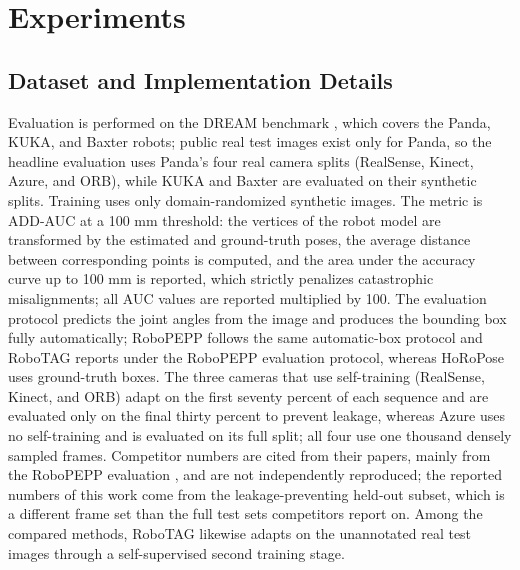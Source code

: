 \section{Experiments}
\label{sec:experiments}

\subsection{Dataset and Implementation Details}
\label{sec:setup}

Evaluation is performed on the DREAM benchmark \cite{lee2020camera}, which covers the Panda, KUKA, and Baxter robots; public real test images exist only for Panda, so the headline evaluation uses Panda's four real camera splits (RealSense, Kinect, Azure, and ORB), while KUKA and Baxter are evaluated on their synthetic splits. Training uses only domain-randomized synthetic images. The metric is ADD-AUC at a 100 mm threshold: the vertices of the robot model are transformed by the estimated and ground-truth poses, the average distance between corresponding points is computed, and the area under the accuracy curve up to 100 mm is reported, which strictly penalizes catastrophic misalignments; all AUC values are reported multiplied by 100. The evaluation protocol predicts the joint angles from the image and produces the bounding box fully automatically; RoboPEPP follows the same automatic-box protocol and RoboTAG reports under the RoboPEPP evaluation protocol, whereas HoRoPose uses ground-truth boxes. The three cameras that use self-training (RealSense, Kinect, and ORB) adapt on the first seventy percent of each sequence and are evaluated only on the final thirty percent to prevent leakage, whereas Azure uses no self-training and is evaluated on its full split; all four use one thousand densely sampled frames. Competitor numbers are cited from their papers, mainly from the RoboPEPP evaluation \cite{goswami2025robopepp}, and are not independently reproduced; the reported numbers of this work come from the leakage-preventing held-out subset, which is a different frame set than the full test sets competitors report on. Among the compared methods, RoboTAG likewise adapts on the unannotated real test images through a self-supervised second training stage.
